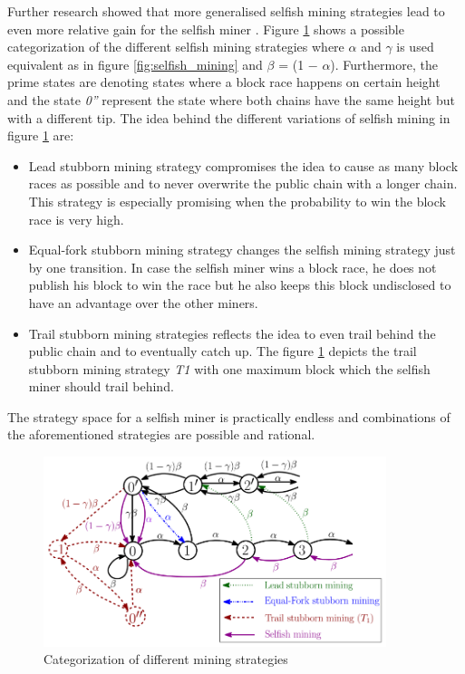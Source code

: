 \documentclass{scrartcl}
\begin{document}
Further research showed that more generalised selfish mining strategies lead to even more relative gain for the selfish miner \cite{nayak2016stubborn,sapirshtein2016optimal, gervais2015tampering, gervais2016security, bahack2013theoretical}. Figure \ref{fig:stubborn_mining} shows a possible categorization of the different selfish mining strategies where $\alpha$ and $\gamma$ is used equivalent as in figure \ref{fig:selfish_mining} and $\beta$ = (1 − $\alpha$). Furthermore, the prime states are denoting states where a block race happens on certain height and the state \textit{0''} represent the state where both chains have the same height but with a different tip. The idea behind the different variations of selfish mining in figure \ref{fig:stubborn_mining} are:
\begin{itemize}
\item Lead stubborn mining strategy compromises the idea to cause as many block races as possible and to never overwrite the public chain with a longer chain. This strategy is especially promising when the probability to win the block race is very high.
\item Equal-fork stubborn mining strategy changes the selfish mining strategy just by one transition. In case the selfish miner wins a block race, he does not publish his block to win the race but he also keeps this block undisclosed to have an advantage over the other miners.
\item Trail stubborn mining strategies reflects the idea to even trail behind the public chain and to eventually catch up. The figure \ref{fig:stubborn_mining} depicts the trail stubborn mining strategy \textit{T1} with one maximum block which the selfish miner should trail behind.
\end{itemize}

The strategy space for a selfish miner is practically endless and combinations of the aforementioned strategies are possible and rational. \cite{nayak2016stubborn,sapirshtein2016optimal, gervais2015tampering, gervais2016security, bahack2013theoretical}


\begin{figure}[t]
\includegraphics[width=10cm]{figures/stubborn_mining}
\centering
\caption{Categorization of different mining strategies \cite{nayak2016stubborn}}
\label{fig:stubborn_mining}
\end{figure}
\end{document}
